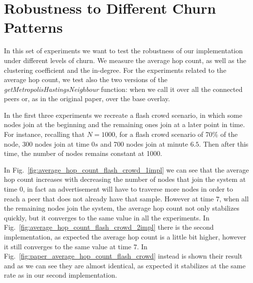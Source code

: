 \section{Robustness to Different Churn Patterns}
\label{sec:robustness}
In this set of experiments we want to test the robustness of our implementation under different levels of churn. We measure the average hop count, as well as the clustering coefficient and the in-degree. For the experiments related to the average hop count, we test also the two versions of the \textit{getMetropolisHastingsNeighbour} function: when we call it over all the connected peers or, as in the original paper, over the base overlay.

In the first three experiments we recreate a flash crowd scenario, in which some nodes join at the beginning and the remaining ones join at a later point in time. For instance, recalling that $N = 1000$, for a flash crowd scenario of 70\% of the node, 300 nodes join at time $0s$ and 700 nodes join at minute $6.5$. Then after this time, the number of nodes remains constant at 1000. 

In Fig.~\ref{fig:average_hop_count_flash_crowd_1impl} we can see that the average hop count increases with decreasing the number of nodes that join the system at time 0, in fact an advertisement will have to traverse more nodes in order to reach a peer that does not already have that sample. However at time $7$, when all the remaining nodes join the system, the average hop count not only stabilizes quickly, but it converges to the same value in all the experiments. In Fig.~\ref{fig:average_hop_count_flash_crowd_2impl} there is the second implementation, as expected the average hop count is a little bit higher, however it still converges to the same value at time $7$. In Fig.~\ref{fig:paper_average_hop_count_flash_crowd} instead is shown their result and as we can see they are almost identical, as expected it stabilizes at the same rate as in our second implementation. 

